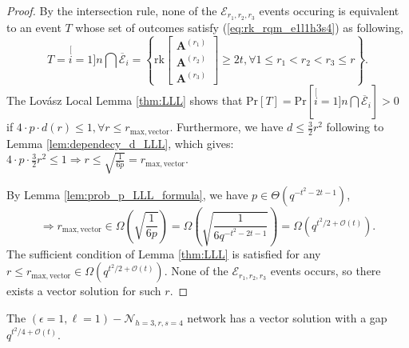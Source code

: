 \begin{proof}
By the intersection rule, none of the $\mathcal{E}_{r_{1},r_{2},r_{3}}$
events occuring is equivalent to an event $T$ whose set of outcomes
satisfy (\ref{eq:rk_rqm_e1l1h3s4}) as following,
\[
T=\stackrel[i=1]{n}{\bigcap}\overline{\mathcal{E}}_{i}=\left\{ \mathrm{rk}\left[\begin{array}{c}
\boldsymbol{A}^{\left(r_{1}\right)}\\
\boldsymbol{A}^{\left(r_{2}\right)}\\
\boldsymbol{A}^{\left(r_{3}\right)}
\end{array}\right]\geq2t,\forall1\leq r_{1}<r_{2}<r_{3}\leq r\right\} .
\]
The Lov\'asz Local Lemma \ref{thm:LLL} shows that $\mathrm{Pr}\left[T\right]=\mathrm{Pr}\left[\stackrel[i=1]{n}{\bigcap}\overline{\mathcal{E}}_{i}\right]>0$
if $4\cdot p\cdot d(r)\leq1,\forall r\leq r_{\mathrm{max,vector}}$.
Furthermore, we have $d\leq\frac{3}{2}r^{2}$ following to Lemma \ref{lem:dependecy_d_LLL},
which gives: $4\cdot p\cdot\frac{3}{2}r^{2}\leq1\Rightarrow r\leq\sqrt{\frac{1}{6p}}=r_{\mathrm{max,vector}}$.

By Lemma \ref{lem:prob_p_LLL_formula}, we have $p\in\Theta\left(q^{-t^{2}-2t-1}\right)$,
\[
\Rightarrow r_{\mathrm{max,vector}}\in\Omega\left(\sqrt{\frac{1}{6p}}\right)=\Omega\left(\sqrt{\frac{1}{6q^{-t^{2}-2t-1}}}\right)=\Omega\left(q^{t^{2}/2+\mathcal{O}\left(t\right)}\right).
\]
The sufficient condition of Lemma \ref{thm:LLL} is satisfied for
any $r\leq r_{\mathrm{max,vector}}\in\Omega\left(q^{t^{2}/2+\mathcal{O}\left(t\right)}\right)$.
None of the $\mathcal{E}_{r_{1},r_{2},r_{3}}$ events occurs, so there
exists a vector solution for such $r$.
\end{proof}
\begin{cor}
The $\left(\epsilon=1,\ell=1\right)-\mathcal{N}_{h=3,r,s=4}$ network
has a vector solution with a gap $q^{t^{2}/4+\mathcal{O}(t)}$.
\end{cor}
